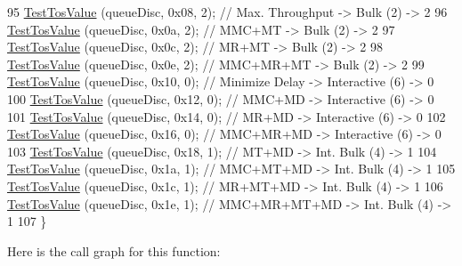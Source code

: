 \begin{DoxyCode}
95   \hyperlink{classPfifoFastQueueDiscTosPrioritization_ae30d51ac2cd62d6874f0fdaf619cf939}{TestTosValue} (queueDisc, 0x08, 2);  \textcolor{comment}{// Max. Throughput -> Bulk (2)        -> 2}
96   \hyperlink{classPfifoFastQueueDiscTosPrioritization_ae30d51ac2cd62d6874f0fdaf619cf939}{TestTosValue} (queueDisc, 0x0a, 2);  \textcolor{comment}{// MMC+MT          -> Bulk (2)        -> 2}
97   \hyperlink{classPfifoFastQueueDiscTosPrioritization_ae30d51ac2cd62d6874f0fdaf619cf939}{TestTosValue} (queueDisc, 0x0c, 2);  \textcolor{comment}{// MR+MT           -> Bulk (2)        -> 2}
98   \hyperlink{classPfifoFastQueueDiscTosPrioritization_ae30d51ac2cd62d6874f0fdaf619cf939}{TestTosValue} (queueDisc, 0x0e, 2);  \textcolor{comment}{// MMC+MR+MT       -> Bulk (2)        -> 2}
99   \hyperlink{classPfifoFastQueueDiscTosPrioritization_ae30d51ac2cd62d6874f0fdaf619cf939}{TestTosValue} (queueDisc, 0x10, 0);  \textcolor{comment}{// Minimize Delay  -> Interactive (6) -> 0}
100   \hyperlink{classPfifoFastQueueDiscTosPrioritization_ae30d51ac2cd62d6874f0fdaf619cf939}{TestTosValue} (queueDisc, 0x12, 0);  \textcolor{comment}{// MMC+MD          -> Interactive (6) -> 0}
101   \hyperlink{classPfifoFastQueueDiscTosPrioritization_ae30d51ac2cd62d6874f0fdaf619cf939}{TestTosValue} (queueDisc, 0x14, 0);  \textcolor{comment}{// MR+MD           -> Interactive (6) -> 0}
102   \hyperlink{classPfifoFastQueueDiscTosPrioritization_ae30d51ac2cd62d6874f0fdaf619cf939}{TestTosValue} (queueDisc, 0x16, 0);  \textcolor{comment}{// MMC+MR+MD       -> Interactive (6) -> 0}
103   \hyperlink{classPfifoFastQueueDiscTosPrioritization_ae30d51ac2cd62d6874f0fdaf619cf939}{TestTosValue} (queueDisc, 0x18, 1);  \textcolor{comment}{// MT+MD           -> Int. Bulk (4)   -> 1}
104   \hyperlink{classPfifoFastQueueDiscTosPrioritization_ae30d51ac2cd62d6874f0fdaf619cf939}{TestTosValue} (queueDisc, 0x1a, 1);  \textcolor{comment}{// MMC+MT+MD       -> Int. Bulk (4)   -> 1}
105   \hyperlink{classPfifoFastQueueDiscTosPrioritization_ae30d51ac2cd62d6874f0fdaf619cf939}{TestTosValue} (queueDisc, 0x1c, 1);  \textcolor{comment}{// MR+MT+MD        -> Int. Bulk (4)   -> 1}
106   \hyperlink{classPfifoFastQueueDiscTosPrioritization_ae30d51ac2cd62d6874f0fdaf619cf939}{TestTosValue} (queueDisc, 0x1e, 1);  \textcolor{comment}{// MMC+MR+MT+MD    -> Int. Bulk (4)   -> 1}
107 \}
\end{DoxyCode}


Here is the call graph for this function\+:


